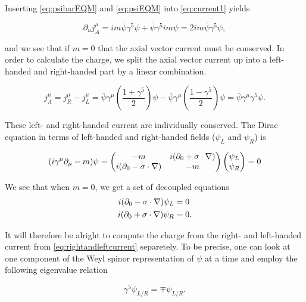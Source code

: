 \documentclass[11pt, a4paper]{amsart}
\begin{document}
Inserting \autoref{eq:psibarEQM} and \autoref{eq:psiEQM} into \autoref{eq:current1} yields

\begin{equation}
\partial_u j^\mu_A = im\bar{\psi}\gamma^5\psi + \bar{\psi}\gamma^5 im \psi = 2im\bar{\psi}\gamma^5 \psi,
\end{equation}

and we see that if $m=0$ that the axial vector current  must be conserved. In order to calculate the charge, we split the axial vector current up into a left-handed and right-handed part by a linear combination.

\begin{equation}
\label{eq:rightandleftcurrent}
j_A^\mu = j_R^\mu - j_L^\mu = \bar{\psi} \gamma^\mu\left(\frac{1 + \gamma^5}{2} \right)\psi - \bar{\psi} \gamma^\mu \left( \frac{1 - \gamma^5}{2}\right) \psi = \bar{\psi}\gamma^\mu\gamma^5\psi.
\end{equation}

These left- and right-handed current are individually  conserved. The Dirac equation in terms of left-handed and right-handed fields ($\psi_L$ and $\psi_R$) is

\begin{equation}
(i\gamma^\mu \partial_\mu - m ) \psi = \begin{pmatrix}
-m & i(\partial_0 + \vb{\sigma} \cdot \nabla) \\
i(\partial_0 - \vb{\sigma} \cdot \nabla) & -m
\end{pmatrix}
\begin{pmatrix}
\psi_L \\ \psi_R
\end{pmatrix}
= 0 
\end{equation}

We see that when $m=0$, we get a set of decoupled equations
\begin{align}
i(\partial_0 - \vb{\sigma} \cdot \nabla) \psi_L &= 0 \\
i(\partial_0 + \vb{\sigma} \cdot \nabla) \psi_R &= 0.
\end{align}

It will therefore be alright to compute the charge from the right- and left-handed current from \autoref{eq:rightandleftcurrent} separetely.  To be precise, one can look at one component of the Weyl spinor representation of $\psi$ at a time and employ the following eigenvalue relation

\begin{equation}
\gamma^5 \psi_{L/R} = \mp \psi_{L/R}.
\end{equation}
\end{document}
